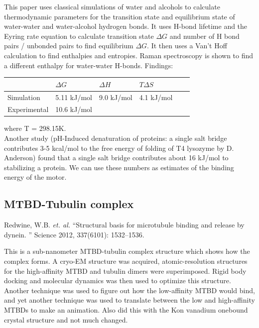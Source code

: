 \documentclass[10pt]{article} %
\begin{document}
This paper uses classical simulations of water and alcohols to calculate thermodynamic parameters for the transition state and equilibrium state of water-water and water-alcohol
hydrogen bonds. It uses H-bond lifetime and the Eyring rate equation to calculate transition state $\Delta G$ and number of H bond pairs / unbonded pairs to find equilibrium
$\Delta G$. It then uses a Van't Hoff calculation to find enthalpies and entropies. Raman spectroscopy is shown to find a different enthalpy for water-water H-bonds. Findings:

\begin{center}
  \begin{tabular}{| l | l | l | l | l | l |}
    \hline
    & $\Delta G$ & $\Delta H$ & $T\Delta S$ \\\hline
    Simulation & 5.11 kJ/mol & 9.0 kJ/mol & 4.1 kJ/mol\\ \hline
    Experimental & 10.6 kJ/mol & & \\ \hline
  \end{tabular}
\end{center}

where T = 298.15K.\\

Another study (pH-Induced denaturation of proteins: a single salt bridge contributes 3-5 kcal/mol to the free energy of folding of T4 lysozyme by D. Anderson) found that
a single salt bridge contributes about 16 kJ/mol to stabilizing a protein. We can use these numbers as estimates of the binding energy of the motor.\\

\subsection{MTBD-Tubulin complex}
Redwine, W.B. \textit{et. al.} ``Structural basis for microtubule binding and release by dynein. '' Science 2012, 337(6101): 1532–1536.

This is a sub-nanometer MTBD-tubulin complex structure which shows how the complex forms. A cryo-EM structure was acquired, atomic-resolution structures for the high-affinity
MTBD and tubulin dimers were superimposed.  Rigid body docking and molecular dynamics was then used to optimize this structure. Another technique was used to figure out how
the low-affinity MTBD would bind, and yet another technique was used to translate between the low and high-affinity MTBDs to make an animation. Also did this with the Kon
vanadium onebound crystal structure and not much changed.\\
\end{document}
